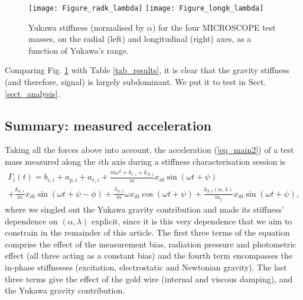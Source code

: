 \documentclass[12pt]{iopart}
\begin{document}
\begin{figure}%
\begin{center}
\texttt{[image: Figure\_radk\_lambda]}
\texttt{[image: Figure\_longk\_lambda]}
\caption{Yukawa stiffness (normalised by $\alpha$) for the four MICROSCOPE test masses, on the radial (left) and longitudinal (right) axes, as a function of Yukawa's range.}
\label{fig_klambda}
\end{center}
\end{figure}

Comparing Fig. \ref{fig_klambda} with Table \ref{tab_results}, it is clear that the gravity stiffness (and therefore, signal) is largely subdominant. We put it to test in  Sect. \ref{sect_analysis}.



\subsection{Summary: measured acceleration}

Taking all the forces above into account, the acceleration (\ref{eq_main2}) of a test mass measured along the $i$th axis during a stiffness characterisation session is
\begin{multline} \label{eq_completeAcc}
\Gamma_i(t) = b_{\epsilon,i} + a_{p,i} + a_{r,i} + \frac{m \omega^2 + k_{\epsilon,i} + k_{N,i}}{m} x_{i0} \sin(\omega t + \psi) \\
+ \frac{k_{w,i}}{m}x_{i0} \sin(\omega t + \psi - \phi) 
+ \frac{\lambda_{w,i}}{m} \omega x_{i0} \cos(\omega t + \psi) 
+ \frac{k_{Y,i}(\alpha, \lambda)}{m_j}x_{i0} \sin(\omega t + \psi),
\end{multline}
where we singled out the Yukawa gravity contribution and made its stiffness' dependence on $(\alpha, \lambda)$ explicit, since it is this very dependence that we aim to constrain in the remainder of this article. The first three terms of the equation comprise the effect of the measurement bias, radiation pressure and photometric effect (all three acting as a constant bias) and the fourth term encompasses the in-phase stiffnesses (excitation, electrostatic and Newtonian gravity). The last three terms give the effect of the gold wire (internal and viscous damping), and the Yukawa gravity contribution. %




\end{document}
